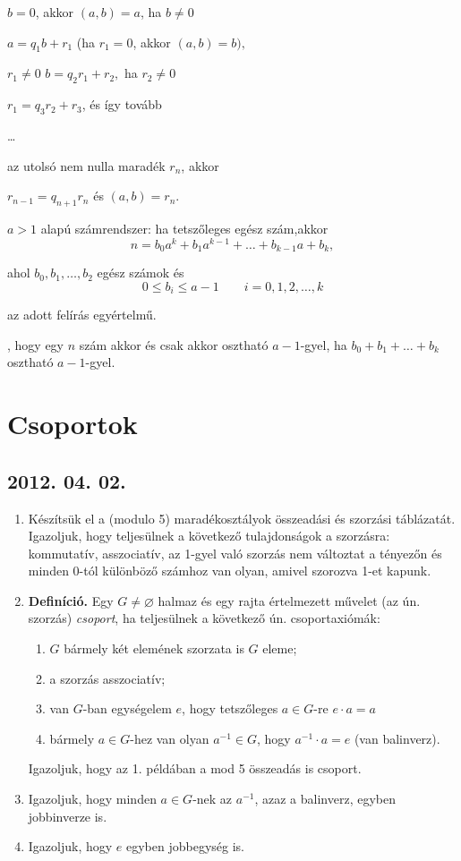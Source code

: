  $b=0$, akkor $(a,b)=a$, ha $b\not=0$

$a=q_1b+r_1$ (ha $r_1=0$, akkor  $(a,b)=b),$

  $r_1\not=0$ $b=q_2r_1+r_2,$ ha $r_2\not=0$

$r_1=q_3r_2+r_3$, és így tovább

\ldots

 az utolsó nem nulla maradék $r_n$, akkor

$r_{n-1}=q_{n+1}r_n$ és $(a,b)=r_n$.

 $a>1$ alapú számrendszer: ha  tetszőleges egész szám,akkor 
$$n=b_0a^k+b_1a^{k-1}+\ldots +b_{k-1}a+b_k,$$

ahol $b_0,b_1,\ldots ,b_2$ egész számok és
$$0\leq b_i\leq a-1\qquad i=0,1,2, \ldots,k$$

az adott felírás egyértelmű.

, hogy egy $n$ szám akkor és csak akkor osztható $a-1$-gyel, ha $b_0+b_1+\ldots+b_k$ osztható $a-1$-gyel.




	
	
\section{Csoportok}

\subsection*{2012. 04. 02.}
\begin{enumerate}
\item Készítsük el a (modulo 5) maradékosztályok összeadási és szorzási táblázatát.\\ Igazoljuk, hogy teljesülnek a következő tulajdonságok a szorzásra: kommutatív, asszociatív, az 1-gyel való szorzás nem változtat a tényezőn és minden 0-tól különböző számhoz van olyan, amivel szorozva 1-et kapunk.
\item \textbf{Definíció.} Egy $G\ne\varnothing$ halmaz és egy rajta értelmezett művelet (az ún. szorzás) \emph{csoport}, ha teljesülnek a következő ún. csoportaxiómák:
\begin{enumerate}[label=(\arabic*)]
\item $G$ bármely két elemének szorzata is $G$ eleme;
\item a szorzás asszociatív;
\item van $G$-ban egységelem $e$, hogy tetszőleges $a\in G$-re $e\cdot a=a$
\item bármely $a\in G$-hez van olyan $a^{-1}\in G$, hogy $a^{-1}\cdot a=e$ (van balinverz).
\end{enumerate}
Igazoljuk, hogy az 1. példában a mod 5 összeadás is csoport.
\item Igazoljuk, hogy minden $a\in G$-nek az $a^{-1}$, azaz a balinverz, egyben jobbinverze is.
\item Igazoljuk, hogy $e$ egyben jobbegység is.
\end{enumerate}

